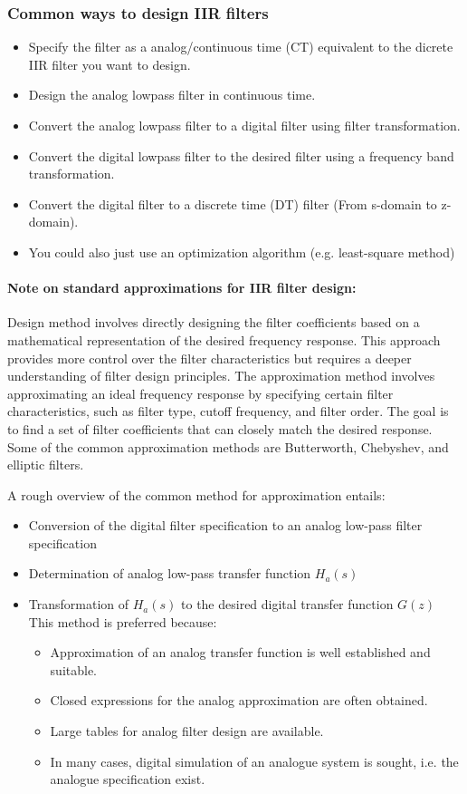 \documentclass{article}
\begin{document}
\subsubsection{Common ways to design IIR filters}
\begin{itemize}
    \item Specify the filter as a analog/continuous time (CT) equivalent to the dicrete IIR filter you want to design.
    \item Design the analog lowpass filter in continuous time.
    \item Convert the analog lowpass filter to a digital filter using filter transformation.
    \item Convert the digital lowpass filter to the desired filter using a frequency band transformation.
    \item Convert the digital filter to a discrete time (DT) filter (From s-domain to z-domain).
    \item You could also just use an optimization algorithm (e.g. least-square method)
\end{itemize}

\paragraph{Note on standard approximations for IIR filter design:}
Design method involves directly designing the filter coefficients based on a mathematical representation of the desired frequency response. This approach provides more control over the filter characteristics but requires a deeper understanding of filter design principles. The approximation method involves approximating an ideal frequency response by specifying certain filter characteristics, such as filter type, cutoff frequency, and filter order. The goal is to find a set of filter coefficients that can closely match the desired response. Some of the common approximation methods are Butterworth, Chebyshev, and elliptic filters. 

A rough overview of the common method for approximation entails:
\begin{itemize}
    \item Conversion of the digital filter specification to an analog low-pass filter specification
    \item Determination of analog low-pass transfer function $H_a(s)$
    \item Transformation of $H_a(s)$ to the desired digital transfer function $G(z)$
    This method is preferred because:
    \begin{itemize}
        \item Approximation of an analog transfer function is well established and suitable.
        \item Closed expressions for the analog approximation are often obtained.
        \item Large tables for analog filter design are available.
        \item In many cases, digital simulation of an analogue system is sought, i.e. the analogue specification exist.
    \end{itemize}
\end{itemize}
\end{document}

